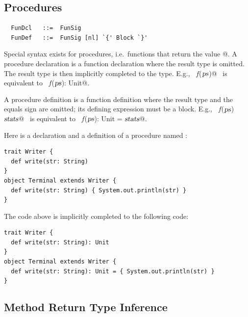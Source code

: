 \subsection{Procedures}\label{sec:procedures}

\syntax\begin{lstlisting} 
  FunDcl   ::=  FunSig
  FunDef   ::=  FunSig [nl] `{' Block `}'
\end{lstlisting}

Special syntax exists for procedures, i.e.\ functions that return the
\verb@Unit@ value \verb@{}@. 
A procedure declaration is a function declaration where the result type
is omitted. The result type is then implicitly completed to the
\verb@Unit@ type. E.g., ~\lstinline@def $f$($\mbox{\sl ps}$)@~ is equivalent to
~\lstinline@def $f$($\mbox{\sl ps}$): Unit@.

A procedure definition is a function definition where the result type
and the equals sign are omitted; its defining expression must be a block.
E.g., ~\lstinline@def $f$($\mbox{\sl ps}$) {$\mbox{\sl stats}$}@~ is equivalent to
~\lstinline@def $f$($\mbox{\sl ps}$): Unit = {$\mbox{\sl stats}$}@.

\example Here is a declaration and a definition of a procedure named \lstinline@write@: 
\begin{lstlisting}
trait Writer { 
  def write(str: String)
}
object Terminal extends Writer {
  def write(str: String) { System.out.println(str) }
}
\end{lstlisting}
The code above is implicitly completed to the following code:
\begin{lstlisting}
trait Writer { 
  def write(str: String): Unit
}
object Terminal extends Writer {
  def write(str: String): Unit = { System.out.println(str) }
}
\end{lstlisting}

\subsection{Method Return Type Inference}\label{sec:meth-type-inf}


